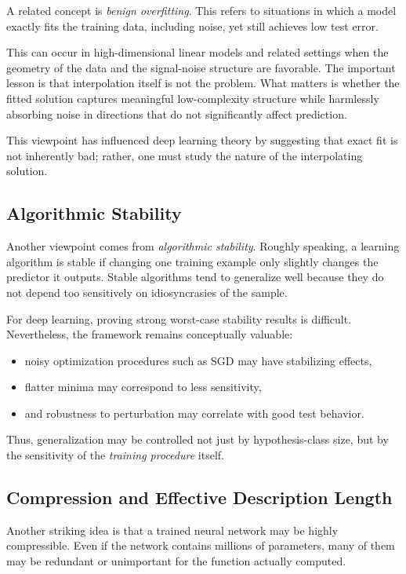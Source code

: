 A related concept is \emph{benign overfitting}. This refers to situations in which a model exactly fits the training data, including noise, yet still achieves low test error.

This can occur in high-dimensional linear models and related settings when the geometry of the data and the signal-noise structure are favorable. The important lesson is that interpolation itself is not the problem. What matters is whether the fitted solution captures meaningful low-complexity structure while harmlessly absorbing noise in directions that do not significantly affect prediction.

This viewpoint has influenced deep learning theory by suggesting that exact fit is not inherently bad; rather, one must study the nature of the interpolating solution.

\subsection{Algorithmic Stability}

Another viewpoint comes from \emph{algorithmic stability}. Roughly speaking, a learning algorithm is stable if changing one training example only slightly changes the predictor it outputs. Stable algorithms tend to generalize well because they do not depend too sensitively on idiosyncrasies of the sample.

For deep learning, proving strong worst-case stability results is difficult. Nevertheless, the framework remains conceptually valuable:
\begin{itemize}
    \item noisy optimization procedures such as SGD may have stabilizing effects,
    \item flatter minima may correspond to less sensitivity,
    \item and robustness to perturbation may correlate with good test behavior.
\end{itemize}

Thus, generalization may be controlled not just by hypothesis-class size, but by the sensitivity of the \emph{training procedure} itself.

\subsection{Compression and Effective Description Length}

Another striking idea is that a trained neural network may be highly compressible. Even if the network contains millions of parameters, many of them may be redundant or unimportant for the function actually computed.

